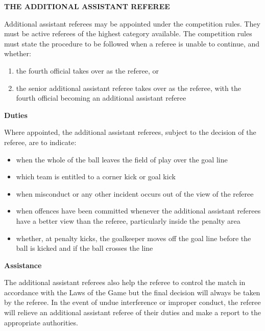 \clearpage
\sffamily
{\bfseries\color[rgb]{0.4,0.4,0.4}
THE ADDITIONAL ASSISTANT REFEREE}
{}

\bigskip

Additional assistant referees may be appointed under the competition rules. They must be active referees of the highest category available. The competition rules must state the procedure to be followed when a referee is unable to continue, and whether:

\begin{enumerate}
\item the fourth official takes over as the referee, or
\item the senior additional assistant referee takes over as the referee, with the fourth official becoming an additional assistant referee
\end{enumerate}

\bigskip

{\bfseries Duties}

\headlinebox

Where appointed, the additional assistant referees, subject to the decision of the referee, are to indicate:

\begin{itemize}
\item when the whole of the ball leaves the field of play over the goal line
\item which team is entitled to a corner kick or goal kick 
\item when misconduct or any other incident occurs out of the view of the referee
\item when offences have been committed whenever the additional assistant referees have a better view than the referee, particularly inside the penalty area
\item whether, at penalty kicks, the goalkeeper moves off the goal line before the ball is kicked and if the ball crosses the line
\end{itemize}

\bigskip

{\bfseries Assistance}

\headlinebox

The additional assistant referees also help the referee to control the match in accordance with the Laws of the Game but the final decision will always be taken by the referee. In the event of undue interference or improper conduct, the referee will relieve an additional assistant
referee of their duties and make a report to the appropriate authorities.